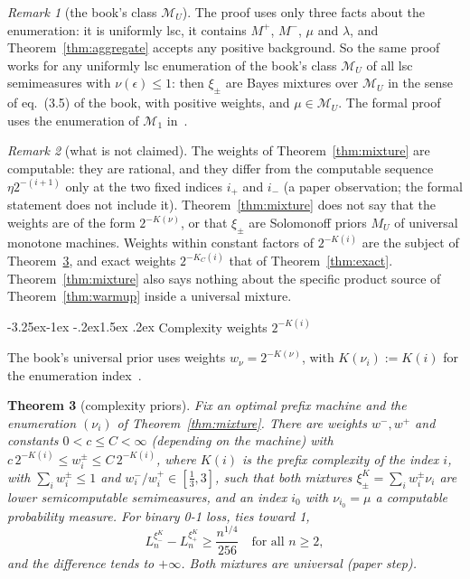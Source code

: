\documentclass[11pt]{article}
\makeatletter
\renewcommand\subsection{\@startsection{subsection}{2}{\z@}%
  {-3.25ex\@plus -1ex \@minus -.2ex}{1.5ex \@plus .2ex}%
  {\normalfont\large\bfseries\boldmath}}
\newcommand{\eps}{\epsilon}
\newcommand{\cM}{\mathcal{M}}
\newcommand{\cMone}{\mathcal{M}_1}
\newtheorem{theorem}{Theorem}[section]
\theoremstyle{definition}
\theoremstyle{remark}
\newtheorem{remark}[theorem]{Remark}
\makeatother
\begin{document}
\begin{remark}[the book's class $\cM_U$]\label{rem:MU}
The proof uses only three facts about the enumeration: it is uniformly lsc, it
contains $M^+$, $M^-$, $\mu$ and $\lambda$, and Theorem~\ref{thm:aggregate}
accepts any positive background. So the same proof works for any uniformly lsc
enumeration of the book's class $\cM_U$ of all lsc semimeasures with
$\nu(\eps)\le1$: then $\xi_\pm$ are Bayes mixtures over $\cM_U$ in the sense
of eq.~(3.5) of the book, with positive weights, and $\mu\in\cM_U$. The formal
proof uses the enumeration of $\cMone$ in~\cite{milovanovlean}.
\end{remark}

\begin{remark}[what is not claimed]
The weights of Theorem~\ref{thm:mixture} are computable: they are rational,
and they differ from the computable sequence $\eta2^{-(i+1)}$ only at the two
fixed indices $i_+$ and $i_-$ (a paper observation; the formal statement does not
include it). Theorem~\ref{thm:mixture} does not say that the weights are of
the form $2^{-K(\nu)}$, or that $\xi_\pm$ are Solomonoff priors $M_U$ of
universal monotone machines. Weights within constant factors of $2^{-K(i)}$
are the subject of Theorem~\ref{thm:complexity}, and exact weights
$2^{-K_C(i)}$ that of Theorem~\ref{thm:exact}. Theorem~\ref{thm:mixture}
also says nothing about the specific product source of
Theorem~\ref{thm:warmup} inside a universal mixture.
\end{remark}

\subsection{Complexity weights $2^{-K(i)}$}

The book's universal prior uses weights $w_\nu=2^{-K(\nu)}$, with
$K(\nu_i):=K(i)$ for the enumeration index~\cite[pp.~48, 67]{hutter2005uai}.

\begin{theorem}[complexity priors]\label{thm:complexity}
Fix an optimal prefix machine and the enumeration $(\nu_i)$ of
Theorem~\ref{thm:mixture}. There are weights $w^-,w^+$ and constants
$0<c\le C<\infty$ (depending on the machine) with
$c\,2^{-K(i)}\le w^\pm_i\le C\,2^{-K(i)}$, where $K(i)$ is the prefix
complexity of the index $i$, with $\sum_iw^\pm_i\le1$ and
$w^-_i/w^+_i\in[\frac13,3]$, such that both mixtures
$\xi^K_\pm=\sum_iw^\pm_i\nu_i$ are lower semicomputable semimeasures, and an index
$i_0$ with $\nu_{i_0}=\mu$ a computable probability measure. For binary 0-1 loss,
ties toward 1,
\[
L_n^{\xi^K_-}-L_n^{\xi^K_+}\ge\frac{n^{1/4}}{256}\quad\text{for all }n\ge2,
\]
and the difference tends to $+\infty$. Both mixtures are universal (paper step).
\end{theorem}
\end{document}
